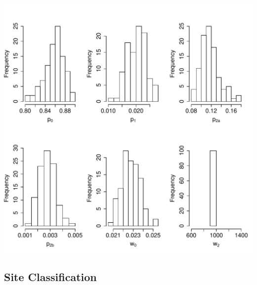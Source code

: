 \documentclass[12pt,letterpaper]{article}\usepackage[]{graphicx}\usepackage[]{color}
\makeatletter
\def\maxwidth{ %
  \ifdim\Gin@nat@width>\linewidth
    \linewidth
  \else
    \Gin@nat@width
  \fi
}
\newenvironment{knitrout}{}{} %
\makeatother
\begin{document}
\begin{knitrout}
\color{fgcolor}

{\centering \includegraphics[width=\maxwidth]{./figures/Sepiida_plots-1} 

}



\end{knitrout}

\clearpage

\subsection*{Site Classification}
\end{document}
